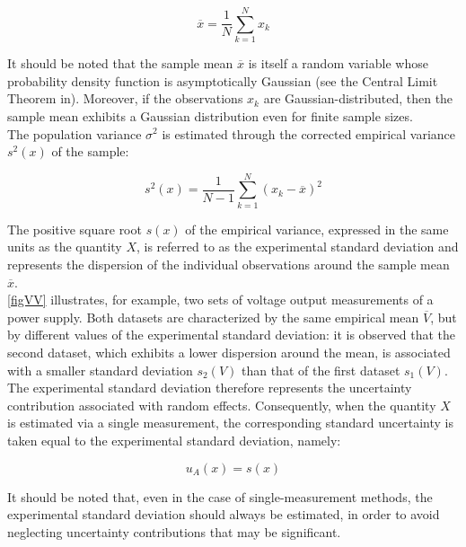 \documentclass[../main.tex]{subfiles}
\begin{document}
\begin{equation}
	\overline{x} = \frac{1}{N} \sum_{k=1}^N x_k
\label{eq:233}
\end{equation}

 It should be noted that the sample mean  $\overline{x}$ is itself a random variable whose probability density function is asymptotically Gaussian (see the Central Limit Theorem in). Moreover, if the observations $x_k$ are Gaussian-distributed, then the sample mean exhibits a Gaussian distribution even for finite sample sizes.\\



The population variance $\sigma^2$ is estimated through the corrected empirical variance $s^2(x)$ of the sample:

\begin{equation}
	s^2(x) = \frac{1}{N - 1} \sum_{k=1}^N(x_k - \overline{x})^2
\end{equation}

The positive square root $s(x)$ of the empirical variance, expressed in the same units as the quantity $X$, is referred to as the experimental standard deviation and represents the dispersion of the individual observations around the sample mean $\overline{x}$.\\

\autoref{figVV} illustrates, for example, two sets of voltage output measurements of a power supply. Both datasets are characterized by the same empirical mean $\overline{V}$, but by different values of the experimental standard deviation: it is observed that the second dataset, which exhibits a lower dispersion around the mean, is associated with a smaller standard deviation $s_2(V)$ than that of the first dataset $s_1(V)$.\\

The experimental standard deviation therefore represents the uncertainty contribution associated with random effects. 
Consequently, when the quantity $X$ is estimated via a single measurement, the corresponding standard uncertainty is taken equal to the experimental standard deviation, namely:

\begin{equation}
	u_A(x) = s(x)
\end{equation}


It should be noted that, even in the case of single-measurement methods, the experimental standard deviation should always be estimated, in order to avoid neglecting uncertainty contributions that may be significant.
\end{document}
